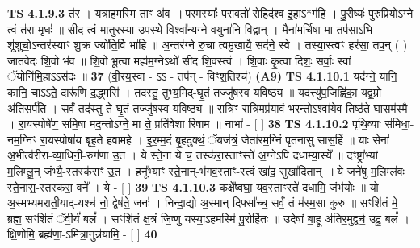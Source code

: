 \documentclass[17pt]{extarticle}
\begin{document}
                                \textbf{ TS 4.1.9.3} \newline
                  त॑र । यत्रा॒हमस्मि॒ ताꣳ अ॑व ॥ प॒र॒मस्याः᳚ परा॒वतो॑ रो॒हिद॑श्व इ॒हाऽ*ग॑हि । पु॒री॒ष्यः॑ पुरुप्रि॒योऽग्ने॒ त्वं त॑रा॒ मृधः॑ ॥ सीद॒ त्वं मा॒तुर॒स्या उ॒पस्थे॒ विश्वा᳚न्यग्ने व॒युना॑नि वि॒द्वान् । मैना॑म॒र्चिषा॒ मा तप॑सा॒ऽभि शू॑शुचो॒ऽन्तर॑स्याꣳ शु॒क्र ज्यो॑ति॒र्वि भा॑हि ॥ अ॒न्तर॑ग्ने रु॒चा त्वमु॒खायै॒ सद॑ने॒ स्वे । तस्या॒स्त्वꣳ हर॑सा॒ तप॒न् ( ) जात॑वेदः शि॒वो भ॑व ॥ शि॒वो भू॒त्वा मह्य॑म॒ग्नेऽथो॑ सीद शि॒वस्त्वं । शि॒वाः कृ॒त्वा दिशः॒ सर्वाः॒ स्वां ॅयोनि॑मि॒हाऽऽस॑दः ॥ \textbf{  37} \newline
                  \newline
                      (वी॒रय॒स्वा - ऽऽ - तप॑न् - विꣳश॒तिश्च॑)  \textbf{(A9)} \newline \newline
                                        \textbf{ TS 4.1.10.1} \newline
                  यद॑ग्ने॒ यानि॒ कानि॒ चाऽऽते॒ दारू॑णि द॒द्ध्मसि॑ । तद॑स्तु॒ तुभ्य॒मिद्-घृ॒तं तज्जु॑षस्व यविष्ठ्य ॥ यदत्त्यु॑प॒जिह्वि॑का॒ यद्व॒म्रो अ॑ति॒सर्प॑ति । सर्वं॒ तद॑स्तु ते घृ॒तं तज्जु॑षस्व यविष्ठ्य ॥ रात्रिꣳ॑ रात्रि॒मप्र॑यावं॒ भर॒न्तोऽश्वा॑येव॒ तिष्ठ॑ते घा॒सम॑स्मै । रा॒यस्पोषे॑ण॒ समि॒षा मद॒न्तोऽग्ने॒ मा ते॒ प्रति॑वेशा रिषाम ॥ नाभा॑ - [  ] \textbf{  38 } \newline
                  \newline
                                \textbf{ TS 4.1.10.2} \newline
                  पृथि॒व्याः स॑मिधा॒-नम॒ग्निꣳ रा॒यस्पोषा॑य बृह॒ते ह॑वामहे । इ॒र॒म्म॒दं बृ॒हदु॑क्थं॒ ॅयज॑त्रं॒ जेता॑रम॒ग्निं पृत॑नासु सास॒हिं ॥ याः सेना॑ अ॒भीत्व॑रीरा-व्या॒धिनी॒-रुग॑णा उ॒त । ये स्ते॒ना ये च॒ तस्क॑रा॒स्ताꣳस्ते॑ अ॒ग्नेऽपि॑ दधाम्या॒स्ये᳚ ॥ दꣳष्ट्रा᳚भ्यां म॒लिम्लू॒न् जंभ्यै॒-स्तस्क॑राꣳ उ॒त । हनू᳚भ्याꣳ स्ते॒नान्-भ॑गव॒स्ताꣳ-स्त्वं खा॑द॒ सुखा॑दितान् ॥ ये जने॑षु म॒लिम्ल॑वः स्ते॒नास॒-स्तस्क॑रा॒ वने᳚ । ये - [  ] \textbf{  39} \newline
                  \newline
                                \textbf{ TS 4.1.10.3} \newline
                  कक्षे᳚ष्वघा॒ यव॒स्ताꣳस्ते॑ दधामि॒ जंभ॑योः ॥ यो अ॒स्मभ्य॑मराती॒याद्-यश्च॑ नो॒ द्वेष॑ते॒ जनः॑ । निन्दा॒द्यो अ॒स्मान् दिफ्सा᳚च्च॒ सर्वं॒ तं म॑स्म॒सा कु॑रु ॥ सꣳशि॑तं मे॒ ब्रह्म॒ सꣳशि॑तं ॅवी॒र्यं॑ बलं᳚ । सꣳशि॑तं क्ष॒त्रं जि॒ष्णु यस्या॒ऽहमस्मि॑ पु॒रोहि॑तः ॥ उदे॑षां बा॒हू अ॑तिर॒मुद्वर्च॒ उदू॒ बलं᳚ । क्षि॒णोमि॒ ब्रह्म॑णा॒-ऽमित्रा॒नुन्न॑यामि॒ - [  ] \textbf{  40} \newline
\end{document}

